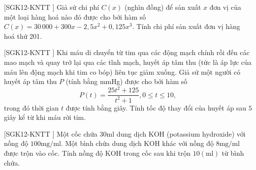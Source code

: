 \begin{bt}%
[SGK12-KNTT ]
	Giả sử chi phí $C(x)$ (nghìn đồng) để sản xuất $x$ đơn vị của một loại hàng hoá nào đó được cho bởi hàm số $C(x)=30\,000+300x-2{,}5x^2+0{,}125x^3$. Tính chi phí sản xuất đơn vị hàng hoá thứ 201.
\end{bt}

\begin{bt}%
[SGK12-KNTT ]
	Khi máu di chuyển từ tim qua các động mạch chính rồi đến các mao mạch và quay trở lại qua các tĩnh mạch, huyết áp tâm thu (tức là áp lực của máu lên động mạch khi tim co bóp) liên tục giảm xuống. Giả sử một người có huyết áp tâm thu $P$ (tính bằng mmHg) được cho bởi hàm số
	$$
	P(t)=\dfrac{25 t^2+125}{t^2+1}, 0 \leq t \leq 10,
	$$
	trong đó thời gian $t$ được tính bằng giây. Tính tốc độ thay đổi của huyết áp sau $5$ giây kể từ khi máu rời tim.
\end{bt}

\begin{bt}%
 [SGK12-KNTT ]
	Một cốc chứa $30 \mathrm{ml}$ dung dịch $\mathrm{KOH}$ (potassium hydroxide) với nồng độ $100 \mathrm{mg} / \mathrm{ml}$.
	Một bình chứa dung dịch $\mathrm{KOH}$ khác với nồng độ $8 \mathrm{mg} / \mathrm{ml}$ được trộn vào cốc.
	Tính nồng độ $\mathrm{KOH}$ trong cốc sau khi trộn $10 (\mathrm{ml})$ từ bình chứa.
\end{bt}


